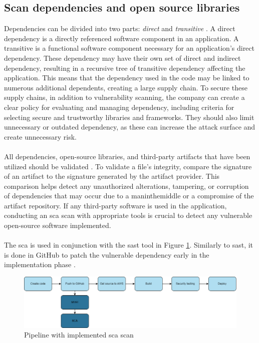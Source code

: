 \subsection{Scan dependencies and open source libraries}
\label{Scan Dependencies and Open Source Libraries}
Dependencies can be divided into two parts: \textit{direct} and \textit{transitive} \cite{googledependency}. A direct dependency is a directly referenced software component in an application. A transitive is a functional software component necessary for an application's direct \gls{dependency}. These \gls{dependency} may have their own set of direct and indirect \gls{dependency}, resulting in a recursive tree of transitive \gls{dependency} affecting the application. This means that the \gls{dependency} used in the code may be linked to numerous additional dependents, creating a large supply chain. To secure these supply chains, in addition to vulnerability scanning, the company can create a clear policy for evaluating and managing \gls{dependency}, including criteria for selecting secure and trustworthy libraries and frameworks. They should also limit unnecessary or outdated \gls{dependency}, as these can increase the attack surface and create unnecessary risk. 
\\~\\
All dependencies, open-source libraries, and third-party \gls{artifact}s that have been utilized should be validated \cite{bestpracticeSupplyChain}. To validate a file's integrity, compare the signature of an artifact to the signature generated by the artifact provider. This comparison helps detect any unauthorized alterations, tampering, or corruption of dependencies that may occur due to a \gls{maninthemiddle} or a compromise of the artifact repository. If any third-party software is used in the application, conducting an \acrshort{sca} scan with appropriate tools is crucial to detect any vulnerable open-source software implemented. 
\\~\\
The \acrshort{sca}  is used in conjunction with the \acrshort{sast} tool in Figure \ref{fig: Pipeline with implemented SCA scan}. Similarly to \acrshort{sast}, it is done in GitHub to patch the vulnerable \gls{dependency} early in the implementation phase \cite{sca}. 

\vspace{2mm}
\begin{figure}[H]
    \centering
    \includegraphics[width=0.8\columnwidth]{Images/pipeline3.png}
    \caption{Pipeline with implemented \acrshort{sca} scan}
    \label{fig: Pipeline with implemented SCA scan}
\end{figure}

